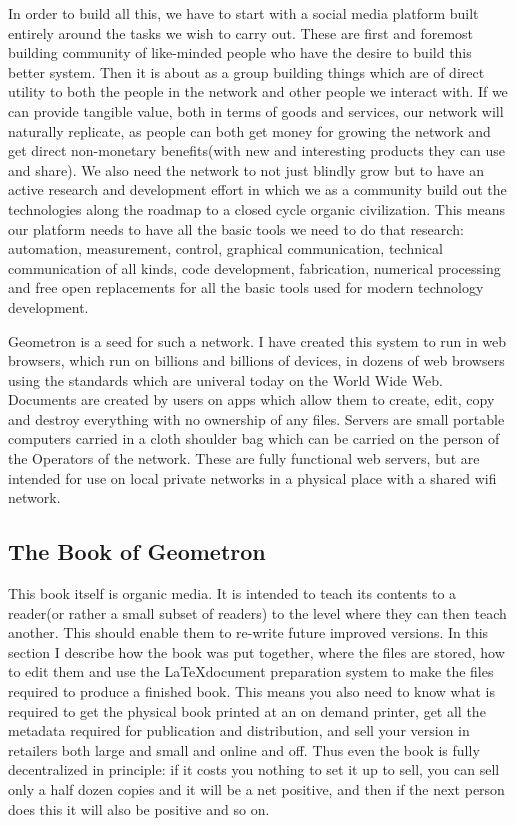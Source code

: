 In order to build all this, we have to start with a social media platform built entirely around the tasks we wish to carry out.  These are first and foremost building community of like-minded people who have the desire to build this better system. Then it is about as a group building things which are of direct utility to both the people in the network and other people we interact with.  If we can provide tangible value, both in terms of goods and services, our network will naturally replicate, as people can both get money for growing the network and get direct non-monetary benefits(with new and interesting products they can use and share).  We also need the network to not just blindly grow but to have an active research and development effort in which we as a community build out the technologies along the roadmap to a closed cycle organic civilization.  This means our platform needs to have all the basic tools we need to do that research: automation, measurement, control, graphical communication, technical communication of all kinds, code development, fabrication, numerical processing and free open replacements for all the basic tools used for modern technology development.  

Geometron is a seed for such a network.  I have created this system to run in web browsers, which run on billions and billions of devices, in dozens of web browsers using the standards which are univeral today on the World Wide Web. Documents are created by users on apps which allow them to create, edit, copy and destroy everything with no ownership of any files.  Servers are small portable computers carried in a cloth shoulder bag which can be carried on the
 person of the Operators of the network. These are fully functional web servers, but are intended for use on local private networks in a physical place with a shared wifi network.

\subsection{The Book of Geometron}

This book itself is organic media. It is intended to teach its contents to a reader(or rather a small subset of readers) to the level where they can then teach another.  This should enable them to re-write future improved versions.  In this section I describe how the book was put together, where the files are stored, how to edit them and use the \LaTeX document preparation system to make the files required to produce a finished book.  This means you also need to know what is required to get the physical book printed at an on demand printer, get all the metadata required for publication and distribution, and sell your version in retailers both large and small and online and off.  Thus even the book is fully decentralized in principle: if it costs you nothing to set it up to sell, you can sell only a half dozen copies and it will be a net positive, and then if the next person does this it will also be positive and so on.

